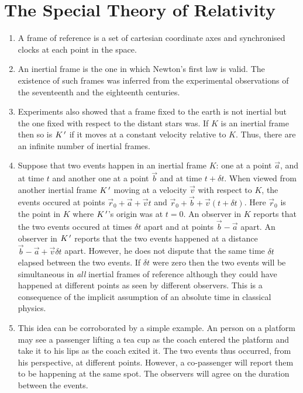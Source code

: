 \chapter{The Special Theory of Relativity}\label{c1}
\begin{enumerate}
\item A frame of reference is a set of cartesian coordinate axes and 
synchronised clocks at each point in the space.

\item An inertial frame is the one in which Newton's first law is valid. The 
existence of such frames was inferred from the experimental observations of the
seventeenth and the eighteenth centuries.

\item Experiments also showed that a frame fixed to the earth is not inertial
but the one fixed with respect to the distant stars was. If $K$ is an inertial
frame then so is $K^{\,\prime}$ if it moves at a constant velocity relative
to $K$. Thus, there are an infinite number of inertial frames.

\item Suppose that two events happen in an inertial frame $K$: one at a point
$\vec{a}$, and at time $t$ and another one at a point $\vec{b}$ and at time 
$t + \delta t$. When viewed from another inertial frame $K^{\,\prime}$ moving at a 
velocity $\vec{v}$ with respect to $K$, the events occured at points $\vec{r}_0 
+ \vec{a} + \vec{v}t$ and $\vec{r}_0 + \vec{b} +\vec{v}(t + \delta t)$. Here 
$\vec{r}_0$ is the point in $K$ where $K^{\,\prime}$'s origin was at $t=0$. An observer 
in $K$ reports that the two events occured at times $\delta t$ apart and at points 
$\vec{b} - \vec{a}$ apart. An observer in $K^{\,\prime}$ reports that the two events 
happened at a distance $\vec{b} - \vec{a} + \vec{v}\delta t$ apart. However, 
he does not dispute that the same time $\delta t$ elapsed between the two events. 
If $\delta t$ were zero then the two events will be simultaneous in \emph{all} 
inertial frames of reference although they could have happened at different 
points as seen by different observers. This is a consequence of the implicit 
assumption of an absolute time in classical physics.

\item This idea can be corroborated by a simple example. An person on a platform may
see a passenger lifting a tea cup as the coach entered the platform and take it
to his lips as the coach exited it. The two events thus occurred, from his 
perspective, at different points. However, a co-passenger will report them to
be happening at the same spot. The observers will agree on the duration between
the events.


\end{enumerate}
